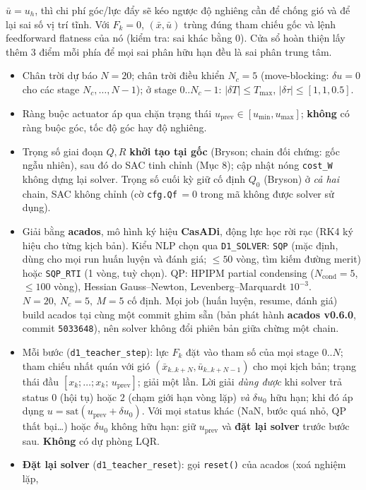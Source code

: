 \documentclass[11pt]{article}
\begin{document}
$\bar u=u_h$, thì chi phí góc/lực đẩy sẽ kéo ngược độ nghiêng cần để chống gió và để lại sai số vị trí tĩnh.
Với $F_k=0$, $(\bar x,\bar u)$ trùng đúng tham chiếu gốc và lệnh feedforward flatness của nó (kiểm tra: sai
khác bằng $0$). Cửa sổ hoàn thiện lấy thêm $3$ điểm mỗi phía để mọi sai phân hữu hạn đều là sai phân trung tâm.
\begin{itemize}[leftmargin=1.4em,itemsep=1pt]
\item Chân trời dự báo $N=20$; chân trời điều khiển $N_c=5$ (move-blocking: $\delta u=0$ cho các stage
$N_c,\dots,N-1$); ở stage $0..N_c-1$: $|\delta T|\le T_{\max}$, $|\delta\tau|\le[1,1,0.5]$.
\item Ràng buộc actuator áp qua chặn trạng thái $u_{\mathrm{prev}}\in[u_{\min},u_{\max}]$; \textbf{không} có
ràng buộc góc, tốc độ góc hay độ nghiêng.
\item Trọng số giai đoạn $Q,R$ \textbf{khởi tạo tại gốc} (Bryson; chain đối chứng: gốc ngẫu nhiên), sau đó do SAC
tinh chỉnh (Mục 8); cập nhật nóng \texttt{cost\_W} không dựng lại solver. Trọng số cuối kỳ giữ cố định $Q_0$
(Bryson) ở \emph{cả hai} chain, SAC không chỉnh (cờ \texttt{cfg.Qf}$\,=0$ trong mã không được solver sử dụng).
\item Giải bằng \textbf{acados}, mô hình ký hiệu \textbf{CasADi}, động lực học rời rạc (RK4 ký hiệu cho
từng kịch bản). Kiểu NLP chọn qua \texttt{D1\_SOLVER}: \texttt{SQP} (mặc định, dùng cho mọi run huấn luyện
và đánh giá; $\le50$ vòng, tìm kiếm đường merit) hoặc \texttt{SQP\_RTI} (1 vòng, tuỳ chọn). QP: HPIPM partial
condensing ($N_{\mathrm{cond}}=5$, $\le100$ vòng), Hessian Gauss--Newton, Levenberg--Marquardt $10^{-3}$.
$N=20,\ N_c=5,\ M=5$ cố định. Mọi job (huấn luyện, resume, đánh giá) build acados tại cùng một commit
ghim sẵn (bản phát hành \textbf{acados v0.6.0}, commit \texttt{5033648}), nên solver không đổi phiên bản giữa chừng một chain.
\item Mỗi bước (\texttt{d1\_teacher\_step}): lực $F_k$ đặt vào tham số của mọi stage $0..N$; tham chiếu nhất
quán với gió $(\bar x_{k..k+N},\bar u_{k..k+N-1})$ cho mọi kịch bản; trạng thái đầu
$[x_k;\dots;x_k;\,u_{\mathrm{prev}}]$; giải một lần. Lời giải \emph{dùng được} khi solver trả status $0$
(hội tụ) hoặc $2$ (chạm giới hạn vòng lặp) \emph{và} $\delta u_0$ hữu hạn; khi đó áp dụng
$u=\mathrm{sat}(u_{\mathrm{prev}}+\delta u_0)$. Với mọi status khác (NaN, bước quá nhỏ, QP thất bại\dots)
hoặc $\delta u_0$ không hữu hạn: giữ $u_{\mathrm{prev}}$ và \textbf{đặt lại solver} trước bước sau.
\textbf{Không} có dự phòng LQR.
\item \textbf{Đặt lại solver} (\texttt{d1\_teacher\_reset}): gọi \texttt{reset()} của acados (xoá nghiệm lặp,

\end{itemize}
\end{document}
